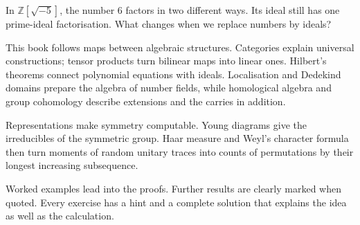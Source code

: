 In $\mathbb{Z}[\sqrt{-5}]$, the number $6$ factors in two different ways. Its ideal still has one prime-ideal factorisation. What changes when we replace numbers by ideals?

This book follows maps between algebraic structures. Categories explain universal constructions; tensor products turn bilinear maps into linear ones. Hilbert's theorems connect polynomial equations with ideals. Localisation and Dedekind domains prepare the algebra of number fields, while homological algebra and group cohomology describe extensions and the carries in addition.

Representations make symmetry computable. Young diagrams give the irreducibles of the symmetric group. Haar measure and Weyl's character formula then turn moments of random unitary traces into counts of permutations by their longest increasing subsequence.

Worked examples lead into the proofs. Further results are clearly marked when quoted. Every exercise has a hint and a complete solution that explains the idea as well as the calculation.
